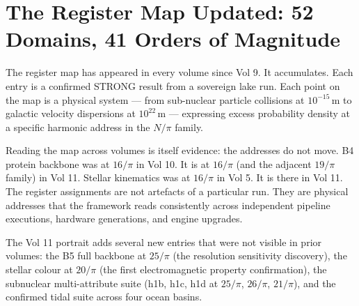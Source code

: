 \documentclass[11pt, letterpaper, openany]{book}
\begin{document}
\section{The Register Map Updated: 52 Domains, 41 Orders of Magnitude}

The register map has appeared in every volume since Vol 9. It accumulates.
Each entry is a confirmed STRONG result from a sovereign lake run. Each point
on the map is a physical system --- from sub-nuclear particle collisions at
$10^{-15}$\,m to galactic velocity dispersions at $10^{22}$\,m --- expressing
excess probability density at a specific harmonic address in the $N/\pi$ family.

Reading the map across volumes is itself evidence: the addresses do not move.
B4 protein backbone was at $16/\pi$ in Vol 10. It is at $16/\pi$ (and
the adjacent $19/\pi$ family) in Vol 11. Stellar kinematics was at $16/\pi$
in Vol 5. It is there in Vol 11. The register assignments are not artefacts
of a particular run. They are physical addresses that the framework reads
consistently across independent pipeline executions, hardware generations,
and engine upgrades.

The Vol 11 portrait adds several new entries that were not visible in prior
volumes: the B5 full backbone at $25/\pi$ (the resolution sensitivity discovery),
the stellar colour at $20/\pi$ (the first electromagnetic property confirmation),
the subnuclear multi-attribute suite (h1b, h1c, h1d at $25/\pi$, $26/\pi$,
$21/\pi$), and the confirmed tidal suite across four ocean basins.
\end{document}
